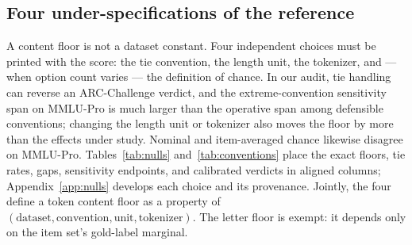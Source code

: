 \subsection{Four under-specifications of the reference}
\label{sec:nulls}

A content floor is not a dataset constant. Four independent choices must be printed with the score: the tie convention, the length unit, the tokenizer, and --- when option count varies --- the definition of chance. In our audit, tie handling can reverse an ARC-Challenge verdict, and the extreme-convention sensitivity span on MMLU-Pro is much larger than the operative span among defensible conventions; changing the length unit or tokenizer also moves the floor by more than the effects under study. Nominal and item-averaged chance likewise disagree on MMLU-Pro. Tables~\ref{tab:nulls} and~\ref{tab:conventions} place the exact floors, tie rates, gaps, sensitivity endpoints, and calibrated verdicts in aligned columns; Appendix~\ref{app:nulls} develops each choice and its provenance. Jointly, the four define a token content floor as a property of $(\text{dataset},\text{convention},\text{unit},\text{tokenizer})$. The letter floor is exempt: it depends only on the item set's gold-label marginal.
